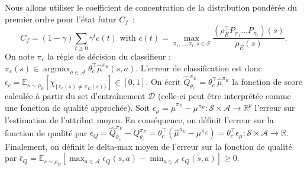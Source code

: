 \documentclass[english,utf8]{./hermes-journal}
\newcommand{\argmax}{\operatorname*{argmax}} %
\newcommand{\s}{\mathcal{S}}
\newcommand{\A}{\mathcal{A}}
\newcommand{\D}{\mathcal{D}}
\newcommand{\E}{\mathbb{E}}
\begin{document}
Nous allons utiliser le coefficient de concentration de la distribution pondérée du premier ordre pour l'état futur $C_f$~\cite{Munos:2007}:
\begin{equation}
  C_f = (1-\gamma)\sum_{t\geq 0} \gamma^t c(t) \text{ with } c(t) =
  \max_{\pi_1,\dots,\pi_t,s\in\s}\frac{(\rho_E^\top P_{\pi_1}\dots
  P_{\pi_t})(s)}{\rho_E(s)}.
\end{equation}
On note $\pi_c$ la règle de décision du classifieur : $\pi_c(s) \in
\argmax_{a\in \A} \theta_c^\top\hat{\mu}^{\pi_E}(s,a)$. L'erreur de classification est donc $\epsilon_c =
\E_{s\sim\rho_E}[\chi_{\{\pi_c(s)\neq\pi_E(s)\}}] \in [0,1]$. On écrit $\hat{Q}^{\pi_E}_{\theta_c} = \theta_c^\top \hat{\mu}^{\pi_E}$ la fonction de score calculée à partir du set d'entraînement $\D$ (celle-ci peut être interprétée comme une fonction de qualité approchée). Soit 
$\epsilon_{\mu} = \hat{\mu}^{\pi_E} - \mu^{\pi_E}:\s\times\A
\rightarrow  \mathbb{R}^p$ l'erreur sur l'estimation de l'attribut moyen.
En conséquence, on définit l'erreur sur la fonction de qualité par 
$\epsilon_Q = \hat{Q}^{\pi_E}_{\theta_c} - Q^{\pi_E}_{\theta_c} =
\theta_c^\top(\hat{\mu}^{\pi_E} - \mu^{\pi_E}) = \theta_c^\top
\epsilon_\mu:\s\times\A\rightarrow\mathbb{R}$. Finalement, on définit le delta-max moyen de l'erreur sur la fonction de qualité par $\bar{\epsilon}_Q =
\E_{s\sim\rho_E}[\max_{a\in\A}\epsilon_Q(s,a) -
\min_{a\in\A}\epsilon_Q(s,a)]\geq 0$.
\end{document}
